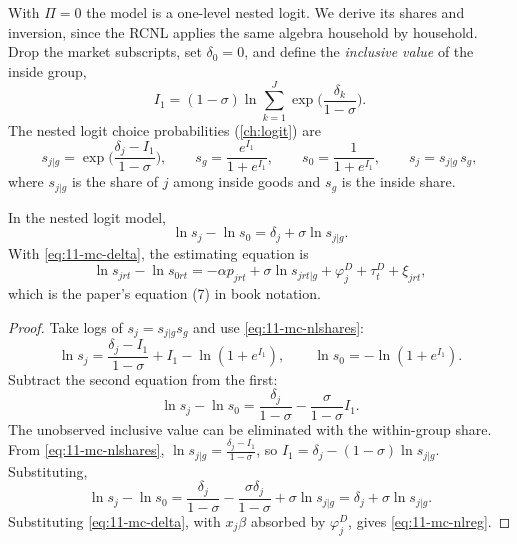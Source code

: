 With $\Pi = 0$ the model is a one-level nested logit. We derive its shares and inversion, since the RCNL applies the
same algebra household by household. Drop the market subscripts, set $\delta_0 = 0$, and define the
\emph{inclusive value} of the inside group,
\begin{equation}\label{eq:11-mc-iv}
  I_1 = (1-\sigma)\ln\sum_{k=1}^{J}\exp\Big(\frac{\delta_k}{1-\sigma}\Big).
\end{equation}
The nested logit choice probabilities (\cref{ch:logit}) are
\begin{equation}\label{eq:11-mc-nlshares}
  s_{j|g} = \exp\Big(\frac{\delta_j - I_1}{1-\sigma}\Big), \qquad
  s_g = \frac{e^{I_1}}{1 + e^{I_1}}, \qquad
  s_0 = \frac{1}{1 + e^{I_1}}, \qquad
  s_j = s_{j|g}\, s_g ,
\end{equation}
where $s_{j|g}$ is the share of $j$ among inside goods and $s_g$ is the inside share.

\begin{proposition}\label{prop:11-mc-nlinv}
In the nested logit model,
\begin{equation}\label{eq:11-mc-nlinv}
  \ln s_j - \ln s_0 = \delta_j + \sigma\ln s_{j|g}.
\end{equation}
With \eqref{eq:11-mc-delta}, the estimating equation is
\begin{equation}\label{eq:11-mc-nlreg}
  \ln s_{jrt} - \ln s_{0rt} = -\alpha p_{jrt} + \sigma\ln s_{jrt|g} + \varphi^D_j + \tau^D_t + \xi_{jrt},
\end{equation}
which is the paper's equation (7) in book notation.
\end{proposition}

\begin{proof}
Take logs of $s_j = s_{j|g}s_g$ and use \eqref{eq:11-mc-nlshares}:
\begin{equation*}
  \ln s_j = \frac{\delta_j - I_1}{1-\sigma} + I_1 - \ln(1 + e^{I_1}), \qquad \ln s_0 = -\ln(1 + e^{I_1}).
\end{equation*}
Subtract the second equation from the first:
\begin{equation*}
  \ln s_j - \ln s_0 = \frac{\delta_j}{1-\sigma} - \frac{\sigma}{1-\sigma}I_1 .
\end{equation*}
The unobserved inclusive value can be eliminated with the within-group share. From \eqref{eq:11-mc-nlshares},
$\ln s_{j|g} = \frac{\delta_j - I_1}{1-\sigma}$, so $I_1 = \delta_j - (1-\sigma)\ln s_{j|g}$. Substituting,
\begin{equation*}
  \ln s_j - \ln s_0 = \frac{\delta_j}{1-\sigma} - \frac{\sigma\delta_j}{1-\sigma} + \sigma\ln s_{j|g}
  = \delta_j + \sigma\ln s_{j|g}.
\end{equation*}
Substituting \eqref{eq:11-mc-delta}, with $x_j\beta$ absorbed by $\varphi_j^D$, gives \eqref{eq:11-mc-nlreg}.
\end{proof}

